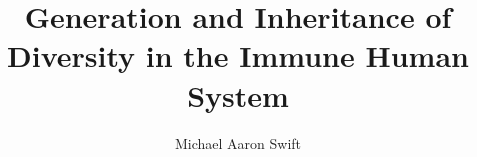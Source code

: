 \documentclass[12pt]{report}
\begin{document}
\title{Generation and Inheritance of Diversity \newline in the Immune Human System}
\author{Michael Aaron Swift}
 

\beforepreface


\afterpreface









\end{document}
